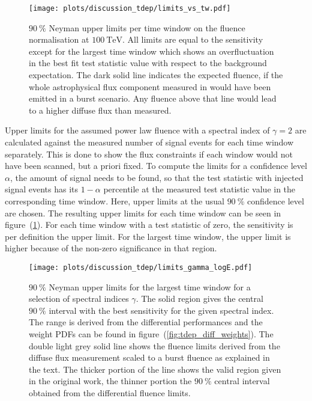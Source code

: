 \begin{figure}[htpb]
  \centering
  \texttt{[image: plots/discussion\_tdep/limits\_vs\_tw.pdf]}
  \caption[Fluence limits for each time windows for the time-dependent analysis]{
    $\SI{90}{\percent}$ Neyman upper limits per time window on the fluence normalisation at $\SI{100}{\TeV}$.
    All limits are equal to the sensitivity except for the largest time window which shows an overfluctuation in the best fit test statistic value with respect to the background expectation.
    The dark solid line indicates the expected fluence, if the whole astrophysical flux component measured in \cite{Haack:2017dxi} would have been emitted in a burst scenario.
    Any fluence above that line would lead to a higher diffuse flux than measured.
  }
  \label{fig:tdep_limits_vs_tw}
\end{figure}

Upper limits for the assumed power law fluence with a spectral index of $\gamma=2$ are calculated against the measured number of signal events for each time window separately.
This is done to show the flux constraints if each window would not have been scanned, but a priori fixed.
To compute the limits for a confidence level $\alpha$, the amount of signal needs to be found, so that the test statistic with injected signal events has its $1-\alpha$ percentile at the measured test statistic value in the corresponding time window.
Here, upper limits at the usual $\SI{90}{\percent}$ confidence level are chosen.
The resulting upper limits for each time window can be seen in figure~(\ref{fig:tdep_limits_vs_tw}).
For each time window with a test statistic of zero, the sensitivity is per definition the upper limit.
For the largest time window, the upper limit is higher because of the non-zero significance in that region.

\begin{figure}[htpb]
  \centering
  \texttt{[image: plots/discussion\_tdep/limits\_gamma\_logE.pdf]}
  \caption[Unbroken power-law fluence limits for the largest time window]{
    $\SI{90}{\percent}$ Neyman upper limits for the largest time window for a selection of spectral indices $\gamma$.
    The solid region gives the central $\SI{90}{\percent}$ interval with the best sensitivity for the given spectral index.
    The range is derived from the differential performances and the weight PDFs can be found in figure~(\ref{fig:tdep_diff_weights}).
    The double light grey solid line shows the fluence limits derived from the diffuse flux measurement scaled to a burst fluence as explained in the text.
    The thicker portion of the line shows the valid region given in the original work, the thinner portion the $\SI{90}{\percent}$ central interval obtained from the differential fluence limits.
  }
  \label{fig:tdep_limits_gamma_logE}
\end{figure}

